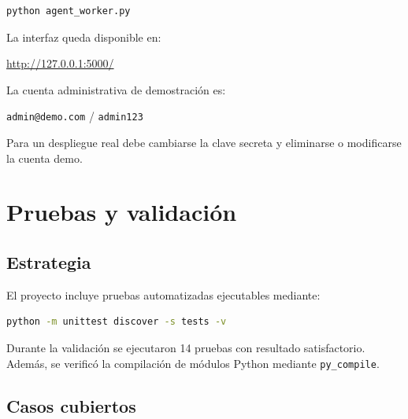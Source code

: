 \documentclass[12pt,a4paper]{article}
\begin{document}
\begin{lstlisting}[language=bash,caption={Terminal 2: worker autónomo.}]
python agent_worker.py
\end{lstlisting}

La interfaz queda disponible en:

\begin{center}
\url{http://127.0.0.1:5000/}
\end{center}

La cuenta administrativa de demostración es:

\begin{center}
\texttt{admin@demo.com} / \texttt{admin123}
\end{center}

Para un despliegue real debe cambiarse la clave secreta y eliminarse o modificarse la cuenta demo.

\section{Pruebas y validación}

\subsection{Estrategia}

El proyecto incluye pruebas automatizadas ejecutables mediante:

\begin{lstlisting}[language=bash]
python -m unittest discover -s tests -v
\end{lstlisting}

Durante la validación se ejecutaron 14 pruebas con resultado satisfactorio. Además, se verificó la compilación de módulos Python mediante \texttt{py\_compile}.

\subsection{Casos cubiertos}
\end{document}
